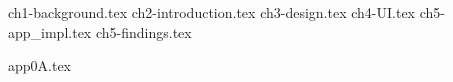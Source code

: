 \documentclass[a4paper, 12pt, oneside]{memoir}
\theoremstyle{plain}
\theoremstyle{plain}
\theoremstyle{plain}
\theoremstyle{definition}
\theoremstyle{plain}
\theoremstyle{plain}
\theoremstyle{plain}
\begin{document}
\renewcommand{\contentsname}{Table of Contents}
\tableofcontents*
{}
\clearpage

\listoftables
{}

\listoffigures
{}
\clearpage
%
%
%
\mainmatter
%
{ch1-background.tex}
{ch2-introduction.tex}
{ch3-design.tex}
{ch4-UI.tex}
{ch5-app_impl.tex}
{ch5-findings.tex}




%
\backmatter
%
\printindex
{}
\renewcommand{\bibname}{References}


\appendix
{app0A.tex}
%
\end{document}
